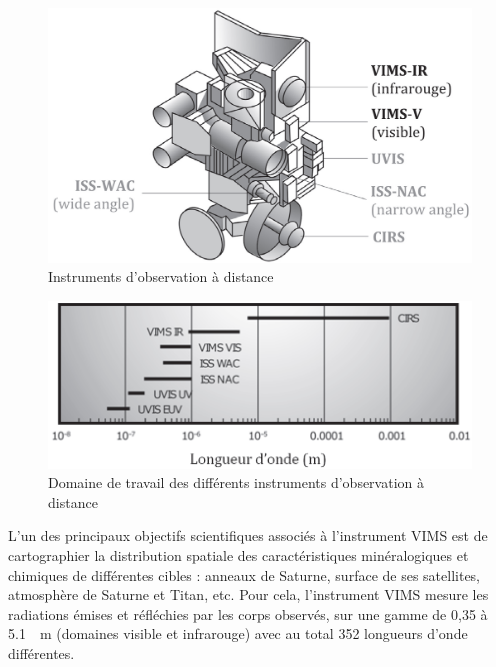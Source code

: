 \documentclass[10pt,fleqn]{article} %
\begin{document}
\begin{minipage}[b]{.45\linewidth}
\begin{figure}[H]
\centering
\includegraphics[width=.9\linewidth]{images/fig_01}
\caption{Instruments d'observation à distance \label{fig_01}}
\end{figure}
\end{minipage}
\hfill
\begin{minipage}[b]{.45\linewidth}
\begin{figure}[H]
\centering
\includegraphics[width=.9\linewidth]{images/fig_02}
\caption{Domaine de travail des différents instruments d'observation à distance \label{fig_02}}
\end{figure}
\end{minipage}

\vspace{.25cm}

L'un des principaux objectifs scientifiques associés à l'instrument VIMS est de cartographier
la distribution spatiale des caractéristiques minéralogiques et chimiques de différentes cibles :
anneaux de Saturne, surface de ses satellites, atmosphère de Saturne et Titan, etc. Pour cela,
l'instrument VIMS mesure les radiations émises et réfléchies par les corps observés, sur une
gamme de 0,35 à \SI{5,1}{\mu m} (domaines visible et infrarouge) avec au total 352 longueurs d'onde
différentes.
\end{document}
